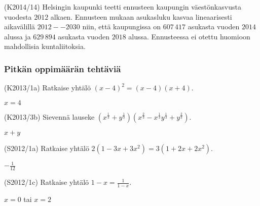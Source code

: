 \begin{tehtava} (K2014/14) Helsingin kaupunki teetti ennusteen kaupungin väestönkasvusta vuodesta $2012$ 
alkaen. Ennusteen mukaan asukasluku kasvaa lineaarisesti aikavälillä $2012--2030$ niin, että kaupungissa 
on $607\,417$ asukasta vuoden $2014$ alussa ja $629\,894$ asukasta vuoden $2018$ alussa. Ennusteessa 
ei otettu huomioon mahdollisia kuntaliitoksia.
    \begin{vastaus}
    \end{vastaus}
\end{tehtava}



\subsubsection*{Pitkän oppimäärän tehtäviä}

\begin{tehtava} (K2013/1a)  Ratkaise yhtälö $(x-4)^2=(x-4)(x+4)$.
	\begin{vastaus}
	$x=4$
	\end{vastaus}
\end{tehtava}

\begin{tehtava}
	(K2013/3b)  Sievennä lauseke $(x^\frac{1}{3} + y^\frac{1}{3})(x^\frac{2}{3} - x^\frac{1}{3}y^\frac{1}{3} + y^\frac{2}{3})$.
		\begin{vastaus}
		$x+y$
		\end{vastaus}
\end{tehtava}
						
\begin{tehtava} (S2012/1a)  Ratkaise yhtälö $2(1-3x+3x^2)=3(1+2x+2x^2)$.
	\begin{vastaus}
		$-\frac{1}{12}$
		\end{vastaus}
\end{tehtava}

\begin{tehtava}(S2012/1c)  Ratkaise yhtälö $1-x=\frac{1}{1-x}$.
			\begin{vastaus}
				$x=0$ tai $x=2$
				\end{vastaus}
\end{tehtava}

